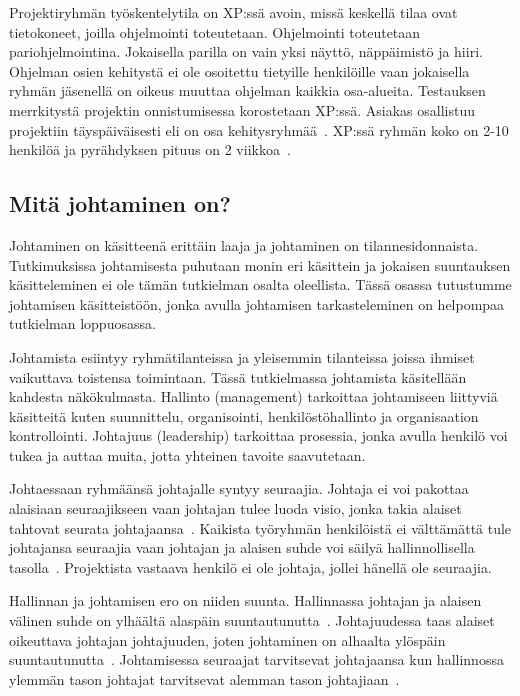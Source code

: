 \documentclass[finnish]{tktltiki2}
\theoremstyle{definition}
\theoremstyle{remark}
\begin{document}
Projektiryhmän työskentelytila on XP:ssä avoin, missä keskellä tilaa ovat tietokoneet, joilla ohjelmointi toteutetaan. Ohjelmointi toteutetaan pariohjelmointina. Jokaisella parilla on vain yksi näyttö, näppäimistö ja hiiri. Ohjelman osien kehitystä ei ole osoitettu tietyille henkilöille vaan jokaisella ryhmän jäsenellä on oikeus muuttaa ohjelman kaikkia osa-alueita. Testauksen merrkitystä projektin onnistumisessa korostetaan XP:ssä. Asiakas osallistuu projektiin täyspäiväisesti eli on osa kehitysryhmää~\cite{796139}. XP:ssä ryhmän koko on 2-10 henkilöä ja pyrähdyksen pituus on 2 viikkoa~\cite{cohen2004introduction}. 


\subsection{Mitä johtaminen on?}

Johtaminen on käsitteenä erittäin laaja ja johtaminen on tilannesidonnaista. Tutkimuksissa johtamisesta puhutaan monin eri käsittein ja jokaisen suuntauksen käsitteleminen ei ole tämän tutkielman osalta oleellista. Tässä osassa tutustumme johtamisen käsitteistöön, jonka avulla johtamisen tarkasteleminen on helpompaa tutkielman loppuosassa.

Johtamista esiintyy ryhmätilanteissa ja yleisemmin tilanteissa joissa ihmiset vaikuttava toistensa toimintaan. Tässä tutkielmassa johtamista käsitellään kahdesta näkökulmasta. Hallinto (management) tarkoittaa johtamiseen liittyviä käsitteitä kuten suunnittelu, organisointi, henkilöstöhallinto ja organisaation kontrollointi. Johtajuus (leadership) tarkoittaa prosessia, jonka avulla henkilö voi tukea ja auttaa muita, jotta yhteinen tavoite saavutetaan.

Johtaessaan ryhmäänsä johtajalle syntyy seuraajia. Johtaja ei voi pakottaa alaisiaan seuraajikseen vaan johtajan tulee luoda visio, jonka takia alaiset tahtovat seurata johtajaansa~\cite{raccoon2006leadership}. Kaikista työryhmän henkilöistä ei välttämättä tule johtajansa seuraajia vaan johtajan ja alaisen suhde voi säilyä hallinnollisella tasolla~\cite{raccoon2006leadership}. Projektista vastaava henkilö ei ole johtaja, jollei hänellä ole seuraajia.

Hallinnan ja johtamisen ero on niiden suunta. Hallinnassa johtajan ja alaisen välinen suhde on ylhäältä alaspäin suuntautunutta~\cite{raccoon2006leadership}. Johtajuudessa taas alaiset oikeuttava johtajan johtajuuden, joten johtaminen on alhaalta ylöspäin suuntautunutta~\cite{raccoon2006leadership}. Johtamisessa seuraajat tarvitsevat johtajaansa kun hallinnossa ylemmän tason johtajat tarvitsevat alemman tason johtajiaan~\cite{raccoon2006leadership}.
\end{document}
